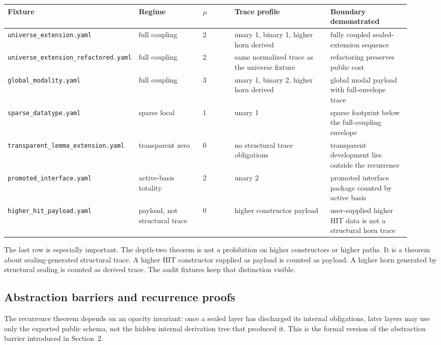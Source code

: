 \begin{center}
\scriptsize
\setlength{\tabcolsep}{2pt}
\begin{tabular}{p{0.24\linewidth}p{0.16\linewidth}p{0.08\linewidth}p{0.24\linewidth}p{0.20\linewidth}}
\hline
Fixture & Regime & \(\mu\) & Trace profile & Boundary demonstrated \\
\hline
\texttt{universe\_extension.yaml}
& full coupling & 2
& unary 1, binary 1, higher horn derived
& fully coupled sealed-extension sequence \\
\hline
\texttt{universe\_extension\_refactored.yaml}
& full coupling & 2
& same normalized trace as the universe fixture
& refactoring preserves public cost \\
\hline
\texttt{global\_modality.yaml}
& full coupling & 3
& unary 1, binary 2, higher horn derived
& global modal payload with full-envelope trace \\
\hline
\texttt{sparse\_datatype.yaml}
& sparse local & 1
& unary 1
& sparse footprint below the full-coupling envelope \\
\hline
\texttt{transparent\_lemma\_extension.yaml}
& transparent zero & 0
& no structural trace obligations
& transparent development lies outside the recurrence \\
\hline
\texttt{promoted\_interface.yaml}
& active-basis totality & 2
& unary 2
& promoted interface package counted by active basis \\
\hline
\texttt{higher\_hit\_payload.yaml}
& payload, not structural trace & 0
& higher constructor payload
& user-supplied higher HIT data is not a structural horn trace \\
\hline
\end{tabular}
\end{center}

The last row is especially important.  The depth-two theorem is not a prohibition on higher
constructors or higher paths.  It is a theorem about sealing-generated structural trace.  A
higher HIT constructor supplied as payload is counted as payload.  A higher horn generated by
structural sealing is counted as derived trace.  The audit fixtures keep that distinction
visible.

\subsection{Abstraction barriers and recurrence proofs}
\label{subsec:barrier-recurrence-artifact}

The recurrence theorem depends on an opacity invariant: once a sealed layer has discharged its
internal obligations, later layers may use only the exported public schema, not the hidden
internal derivation tree that produced it.  This is the formal version of the abstraction
barrier introduced in Section~2.


